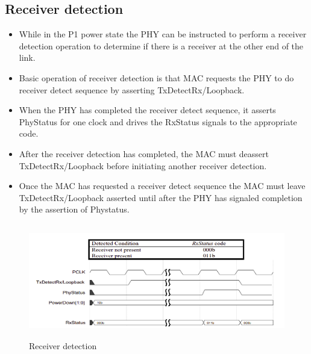 \subsection{Receiver detection}
\begin{itemize}
    \item While in the P1 power state the PHY can be instructed to perform a  receiver detection operation to determine if there is a receiver at the other end of the link.

    \item Basic operation of receiver detection is that MAC requests the PHY to do receiver detect sequence by asserting TxDetectRx/Loopback.

    \item When the PHY has completed the receiver detect sequence, it asserts PhyStatus for one clock and drives the RxStatus signals to the appropriate code.

    \item After the receiver detection has completed, the MAC must deassert TxDetectRx/Loopback before initiating another receiver detection.

    \item Once the MAC has requested a receiver detect sequence the MAC must leave TxDetectRx/Loopback asserted until after the PHY has signaled completion by the assertion of Phystatus.
\end{itemize}




\begin{figure}[H]
  \centering
  \includegraphics[width=130mm,height=50mm]{images/clk_diagram/detection.png}
  \caption{Receiver detection}
  \label{lane}
\end{figure}

